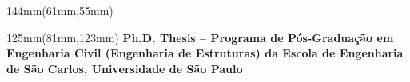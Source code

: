 \documentclass[
12pt,		%
openright,	%
twoside,  %
a4paper,			%
chapter=TITLE,		%
english,			%
french,				%
spanish,			%
brazil				%
]{USPSC-classe/USPSC}
\begin{document}
\begin{minipage}[c]{144mm}
	\centering
	\begin{textblock*}{144mm}(61mm,55mm)
		\vspace*{1.2cm} %
		\linespread{0.8} %
		\ABNTEXchapterfont\bfseries\Large
		\textcolor{capa-azul}{\nohyphens{\imprimirtitulo}}
		
		\vspace*{1.5em} %
		\ABNTEXsubsectionfontsize
		\imprimirtitleabstract
	\end{textblock*}
\end{minipage}
\vfill
\vspace*{5cm}
\begin{minipage}[t][65mm][t]{125mm}
	\begin{textblock*}{125mm}(81mm,123mm)
		\ABNTEXchapterfont\bfseries\Large
		\textcolor{capa-azul}{\nohyphens{\imprimirautor}}
		\vfill
		\vspace{12pt}
		\ABNTEXsubsectionfontsize\small
		\renewcommand{\ABNTEXsubsectionfontsize}{\fontsize{10}{6}\normalfont}
		\ABNTEXsubsectionfontsize
		\textcolor{capa-azul}{\nohyphens{Ph.D. Thesis -- Programa de P\'os-Gradua\c{c}\~ao em Engenharia Civil (Engenharia de Estruturas) da Escola de Engenharia de S\~ao Carlos, Universidade de S\~ao Paulo%
		}}
		\renewcommand{\ABNTEXsubsectionfontsize}{\fontsize{12}{12}\normalfont}
	\end{textblock*}	
\end{minipage}
\newpage
\AddToShipoutPicture{\BackgroundLimpo}
\imprimirfolhaderosto*

%


\end{document}
